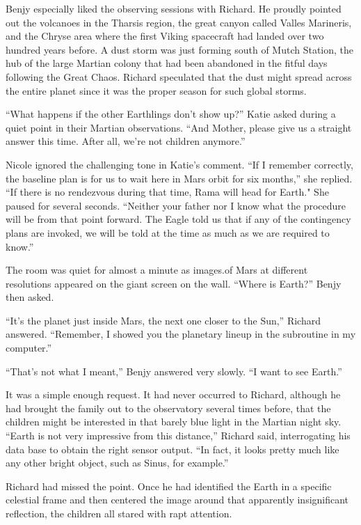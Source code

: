 \documentclass[]{article}
\begin{document}
{Benjy especially liked the observing sessions with Richard.  He proudly pointed out the volcanoes in the Tharsis region, the great canyon called Valles Marineris, and the Chryse area where the first Viking spacecraft had landed over two hundred years before.  A dust storm was just forming south of Mutch Station, the hub of the large Martian colony that had been abandoned in the fitful days following the Great Chaos.  Richard speculated that the dust might spread across the entire planet since it was the proper season for such global storms.

“What happens if the other Earthlings don’t show up?” Katie asked during a quiet point in their Martian observations.  “And Mother, please give us a straight answer this time.  After all, we’re not children anymore.”

Nicole ignored the challenging tone in Katie’s comment.  “If I remember correctly, the baseline plan is for us to wait here in Mars orbit for six months,” she replied.  “If there is no rendezvous during that time, Rama will head for Earth."  She paused for several seconds.  “Neither your father nor I know what the procedure will be from that point forward.  The Eagle told us that if any of the contingency plans are invoked, we will be told at the time as much as we are required to know.”

The room was quiet for almost a minute as images.of Mars at different resolutions appeared on the giant screen on the wall.  “Where is Earth?” Benjy then asked.

“It’s the planet just inside Mars, the next one closer to the Sun,” Richard answered.  “Remember, I showed you the planetary lineup in the subroutine in my computer.”

“That’s not what I meant,” Benjy answered very slowly.  “I want to see Earth.”

It was a simple enough request.  It had never occurred to Richard, although he had brought the family out to the observatory several times before, that the children might be interested in that barely blue light in the Martian night sky.  “Earth is not very impressive from this distance,” Richard said, interrogating his data base to obtain the right sensor output.  “In fact, it looks pretty much like any other bright object, such as Sinus, for example.”

Richard had missed the point.  Once he had identified the Earth in a specific celestial frame and then centered the image around that apparently insignificant reflection, the children all stared with rapt attention.

}
\end{document}
